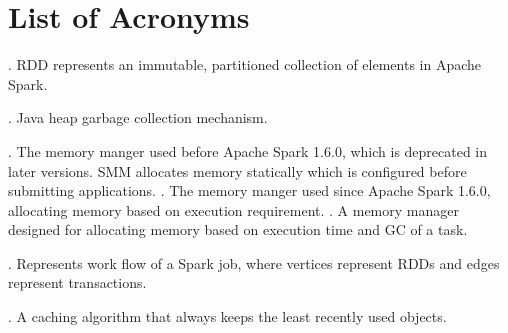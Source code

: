 
\chapter*{List of Acronyms}

\begin{acronym}
.
RDD represents an immutable, partitioned collection of elements in Apache Spark.

.
Java heap garbage collection mechanism.

.
	The memory manger used before Apache Spark 1.6.0, which is deprecated in later versions. SMM allocates memory statically which is configured before submitting applications.
.
    The memory manger used since Apache Spark 1.6.0, allocating memory based on execution requirement.
.
  A memory manager designed for allocating memory based on execution time and GC of a task.

.
Represents work flow of a Spark job, where vertices represent RDDs and edges represent transactions. 

.
A caching algorithm that always keeps the least recently used objects. 

\end{acronym}
